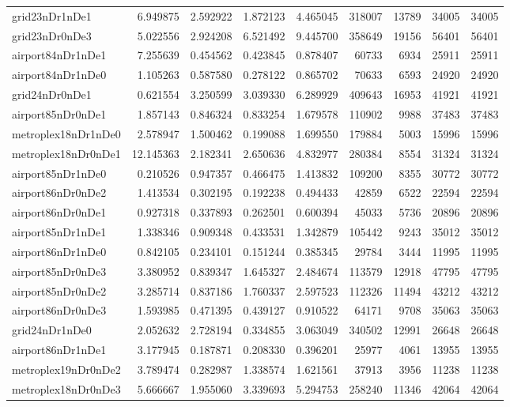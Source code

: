\documentclass[../../../thesis.tex]{subfiles}
\begin{document}
\begin{longtable}{|l|r|r|r|r|r|r|r|r|}
grid23nDr1nDe1 & 6.949875 & 2.592922 & 1.872123 & 4.465045 & 318007 & 13789 & 34005 & 34005 \\
grid23nDr0nDe3 & 5.022556 & 2.924208 & 6.521492 & 9.445700 & 358649 & 19156 & 56401 & 56401 \\
airport84nDr1nDe1 & 7.255639 & 0.454562 & 0.423845 & 0.878407 & 60733 & 6934 & 25911 & 25911 \\
airport84nDr1nDe0 & 1.105263 & 0.587580 & 0.278122 & 0.865702 & 70633 & 6593 & 24920 & 24920 \\
grid24nDr0nDe1 & 0.621554 & 3.250599 & 3.039330 & 6.289929 & 409643 & 16953 & 41921 & 41921 \\
airport85nDr0nDe1 & 1.857143 & 0.846324 & 0.833254 & 1.679578 & 110902 & 9988 & 37483 & 37483 \\
metroplex18nDr1nDe0 & 2.578947 & 1.500462 & 0.199088 & 1.699550 & 179884 & 5003 & 15996 & 15996 \\
metroplex18nDr0nDe1 & 12.145363 & 2.182341 & 2.650636 & 4.832977 & 280384 & 8554 & 31324 & 31324 \\
airport85nDr1nDe0 & 0.210526 & 0.947357 & 0.466475 & 1.413832 & 109200 & 8355 & 30772 & 30772 \\
airport86nDr0nDe2 & 1.413534 & 0.302195 & 0.192238 & 0.494433 & 42859 & 6522 & 22594 & 22594 \\
airport86nDr0nDe1 & 0.927318 & 0.337893 & 0.262501 & 0.600394 & 45033 & 5736 & 20896 & 20896 \\
airport85nDr1nDe1 & 1.338346 & 0.909348 & 0.433531 & 1.342879 & 105442 & 9243 & 35012 & 35012 \\
airport86nDr1nDe0 & 0.842105 & 0.234101 & 0.151244 & 0.385345 & 29784 & 3444 & 11995 & 11995 \\
airport85nDr0nDe3 & 3.380952 & 0.839347 & 1.645327 & 2.484674 & 113579 & 12918 & 47795 & 47795 \\
airport85nDr0nDe2 & 3.285714 & 0.837186 & 1.760337 & 2.597523 & 112326 & 11494 & 43212 & 43212 \\
airport86nDr0nDe3 & 1.593985 & 0.471395 & 0.439127 & 0.910522 & 64171 & 9708 & 35063 & 35063 \\
grid24nDr1nDe0 & 2.052632 & 2.728194 & 0.334855 & 3.063049 & 340502 & 12991 & 26648 & 26648 \\
airport86nDr1nDe1 & 3.177945 & 0.187871 & 0.208330 & 0.396201 & 25977 & 4061 & 13955 & 13955 \\
metroplex19nDr0nDe2 & 3.789474 & 0.282987 & 1.338574 & 1.621561 & 37913 & 3956 & 11238 & 11238 \\
metroplex18nDr0nDe3 & 5.666667 & 1.955060 & 3.339693 & 5.294753 & 258240 & 11346 & 42064 & 42064 \\

\end{longtable}
\end{document}
